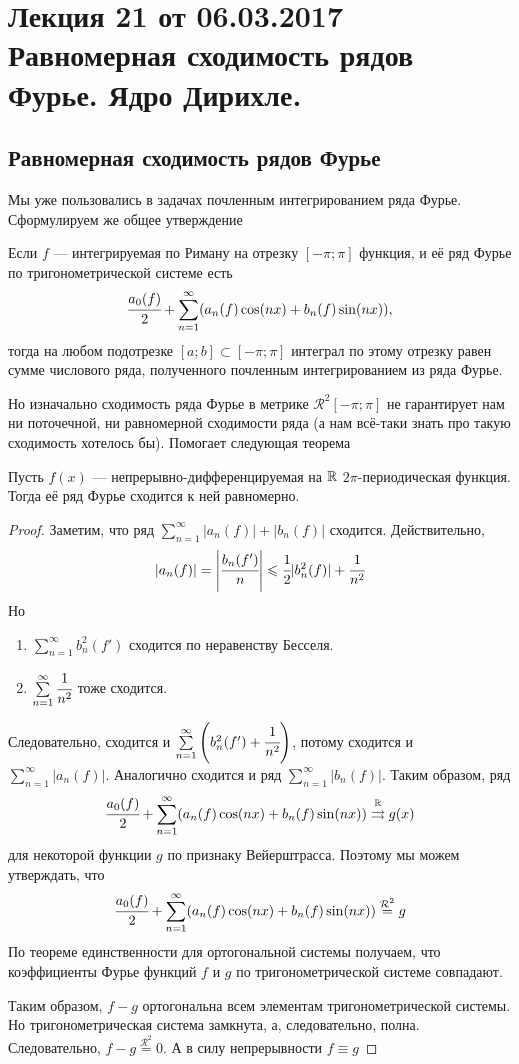 \pagestyle{fancy}
\section{Лекция 21 от 06.03.2017 \\ Равномерная сходимость рядов Фурье. Ядро Дирихле.}
\subsection{Равномерная сходимость рядов Фурье}
Мы уже пользовались в задачах почленным интегрированием ряда Фурье. Сформулируем же общее утверждение
\begin{Statement}
	Если $f$ --- интегрируемая по Риману на отрезку $[-\pi;\pi]$  функция, и её ряд Фурье по тригонометрической системе есть
	$$
		\cfrac{a_0(f)}{2} + \sum\limits_{n=1}^{\infty}(a_n(f)\cos(nx) + b_n(f)\sin(nx)),
	$$
	 тогда на любом подотрезке $[a;b] \subset [-\pi; \pi]$ интеграл по этому отрезку равен сумме числового ряда, полученного почленным интегрированием из ряда Фурье.
\end{Statement}
Но изначально сходимость ряда Фурье в метрике $\mathcal{R}^2[-\pi; \pi]$ не гарантирует нам ни поточечной, ни равномерной сходимости ряда (а нам всё-таки знать про такую сходимость хотелось бы). Помогает следующая теорема
\begin{Theorem}
	Пусть $f(x)$ --- непрерывно-дифференцируемая на $\mathbb{R}$ $2\pi$-периодическая функция. Тогда её ряд Фурье сходится к ней равномерно.
\end{Theorem}
\begin{proof}
	Заметим, что ряд $\sum\limits_{n=1}^{\infty} |a_n(f)| + |b_n(f)|$ сходится. Действительно,
	$$
		|a_n(f)| = \left|\cfrac{b_n(f')}{n}\right| \leqslant \cfrac{1}{2} |b_n^2(f)| + \cfrac{1}{n^2}
	$$
	Но
	\begin{enumerate}
		\item $\sum\limits_{n=1}^{\infty} b_n^2(f')$ сходится по неравенству Бесселя.
		\item $\sum\limits_{n=1}^{\infty} \cfrac{1}{n^2}$ тоже сходится.
	\end{enumerate}
	Следовательно, сходится и $\sum\limits_{n=1}^{\infty}\left(b_n^2(f') + \cfrac{1}{n^2}\right)$, потому сходится и $\sum \limits_{n=1}^{\infty}|a_n(f)|$. Аналогично сходится и ряд $\sum \limits_{n=1}^{\infty}|b_n(f)|$. Таким образом, ряд 
	$$
		\cfrac{a_0(f)}{2} + \sum\limits_{n=1}^{\infty}(a_n(f)\cos(nx)+ b_n(f)\sin(nx)) \overset{\mathbb{R}}{\rightrightarrows} g(x)
	$$
	для некоторой функции $g$ по признаку Вейерштрасса. Поэтому мы можем утверждать, что
	$$
		\cfrac{a_0(f)}{2} + \sum\limits_{n=1}^{\infty}(a_n(f)\cos(nx)+ b_n(f)\sin(nx)) \overset{\mathcal{R}^2}{=} g
	$$
	По теореме единственности для ортогональной системы получаем, что коэффициенты Фурье функций $f$ и $g$ по тригонометрической системе совпадают.
	\par Таким образом, $f-g$ ортогональна всем элементам тригонометрической системы. Но тригонометрическая система замкнута, а, следовательно, полна. Следовательно, $f-g \overset{\mathcal{R}^2}{=} 0$. А в силу непрерывности $f \equiv g$
\end{proof}

